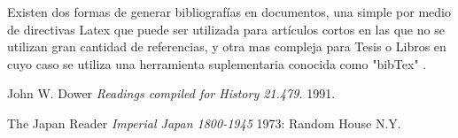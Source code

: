 \documentclass{article}
\begin{document}
Existen dos formas de generar bibliografías en documentos, una simple \cite{simple} por medio de directivas Latex que puede ser utilizada para artículos cortos en las que no se utilizan gran cantidad de referencias, y otra mas compleja \cite{bibtex} para Tesis o Libros en cuyo caso se utiliza una herramienta suplementaria conocida como "bibTex" .

\begin{thebibliography}{1}

   John W. Dower {\em Readings compiled for History
  21.479.}  1991.

    The Japan Reader {\em Imperial Japan 1800-1945} 1973:
  Random House N.Y. 

  \end{thebibliography}
\end{document}
